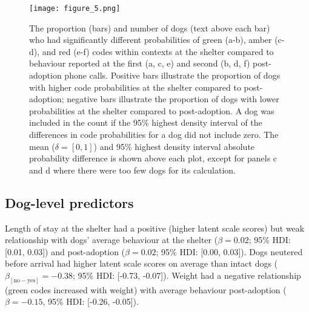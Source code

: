 \documentclass[12pt]{article}
\begin{document}
\begin{figure}[t!]
  \centering
  \texttt{[image: figure\_5.png]}
  \caption{The proportion (bars) and number of dogs (text above each bar) who had significantly different probabilities of green (a-b), amber (c-d), and red (e-f) codes within contexts at the shelter compared to behaviour reported at the first (a, c, e) and second (b, d, f) post-adoption phone calls. Positive bars illustrate the proportion of dogs with higher code probabilities at the shelter compared to post-adoption; negative bars illustrate the proportion of dogs with lower probabilities at the shelter compared to post-adoption. A dog was included in the count if the 95\% highest density interval of the differences in code probabilities for a dog did not include zero. The mean ($\delta = [0,1]$) and 95\% highest density interval absolute probability difference is shown above each plot, except for panels c and d where there were too few dogs for its calculation.}
  \label{fig_num_dogs}
\end{figure}

\subsection{Dog-level predictors}
Length of stay at the shelter had a positive (higher latent scale scores) but weak relationship with dogs' average behaviour at the shelter ($\beta = 0.02$; 95\% HDI: [0.01, 0.03]) and post-adoption ($\beta = 0.02$; 95\% HDI: [0.00, 0.03]). Dogs neutered before arrival had higher latent scale scores on average than intact dogs ($\beta_{[\text{no}-\text{yes}]} = -0.38$; 95\% HDI: [-0.73, -0.07]). Weight had a negative relationship (green codes increased with weight) with average behaviour post-adoption ($\beta = -0.15$, 95\% HDI: [-0.26, -0.05]).
\end{document}
